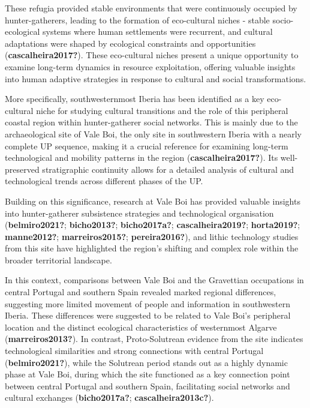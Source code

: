 \documentclass[
  a4paper,
  DIV=11,
  numbers=noendperiod]{scrreprt}
\begin{document}
These refugia provided stable environments that were continuously
occupied by hunter-gatherers, leading to the formation of eco-cultural
niches - stable socio-ecological systems where human settlements were
recurrent, and cultural adaptations were shaped by ecological
constraints and opportunities (\textbf{cascalheira2017?}). These
eco-cultural niches present a unique opportunity to examine long-term
dynamics in resource exploitation, offering valuable insights into human
adaptive strategies in response to cultural and social transformations.

More specifically, southwesternmost Iberia has been identified as a key
eco-cultural niche for studying cultural transitions and the role of
this peripheral coastal region within hunter-gatherer social networks.
This is mainly due to the archaeological site of Vale Boi, the only site
in southwestern Iberia with a nearly complete UP sequence, making it a
crucial reference for examining long-term technological and mobility
patterns in the region (\textbf{cascalheira2017?}). Its well-preserved
stratigraphic continuity allows for a detailed analysis of cultural and
technological trends across different phases of the UP.

Building on this significance, research at Vale Boi has provided
valuable insights into hunter-gatherer subsistence strategies and
technological organisation (\textbf{belmiro2021?}; \textbf{bicho2013?};
\textbf{bicho2017a?}; \textbf{cascalheira2019?}; \textbf{horta2019?};
\textbf{manne2012?}; \textbf{marreiros2015?}; \textbf{pereira2016?}),
and lithic technology studies from this site have highlighted the
region's shifting and complex role within the broader territorial
landscape.

In this context, comparisons between Vale Boi and the Gravettian
occupations in central Portugal and southern Spain revealed marked
regional differences, suggesting more limited movement of people and
information in southwestern Iberia. These differences were suggested to
be related to Vale Boi's peripheral location and the distinct ecological
characteristics of westernmost Algarve (\textbf{marreiros2013?}). In
contrast, Proto-Solutrean evidence from the site indicates technological
similarities and strong connections with central Portugal
(\textbf{belmiro2021?}), while the Solutrean period stands out as a
highly dynamic phase at Vale Boi, during which the site functioned as a
key connection point between central Portugal and southern Spain,
facilitating social networks and cultural exchanges
(\textbf{bicho2017a?}; \textbf{cascalheira2013c?}).
\end{document}

